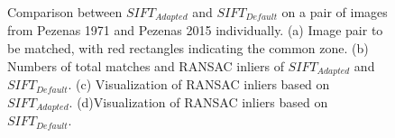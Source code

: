\begin{figure}[htbp]
\begin{center}
{\begin{minipage}[t]{0.48\linewidth}
			\end{minipage}%
		}
		\caption{{\scriptsize Comparison between $SIFT_{Adapted}$ and $SIFT_{Default}$ on a pair of images from Pezenas 1971 and Pezenas 2015 individually. (a) Image pair to be matched, with red rectangles indicating the common zone. (b) Numbers of total matches and RANSAC inliers of $SIFT_{Adapted}$ and $SIFT_{Default}$. (c) Visualization of RANSAC inliers based on $SIFT_{Adapted}$. (d)Visualization of RANSAC inliers based on $SIFT_{Default}$.}}
		\label{SIFTComp_ImgPair}
	\end{center}
\end{figure} 

